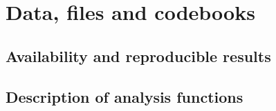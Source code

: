 \chapter{Data, files and codebooks}

\section{Availability and reproducible results}

\section{Description of analysis functions}

\blindtext[10]
